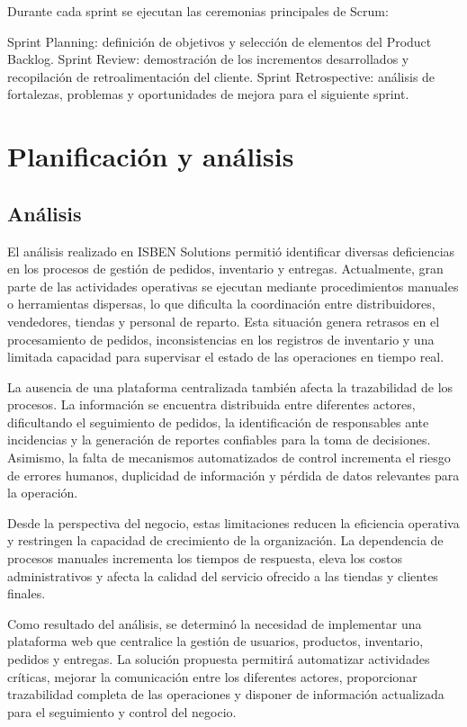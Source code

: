 \documentclass[12pt,a4paper]{report}
\begin{document}
Durante cada sprint se ejecutan las ceremonias principales de Scrum:

Sprint Planning: definición de objetivos y selección de elementos del Product Backlog.
Sprint Review: demostración de los incrementos desarrollados y recopilación de retroalimentación del cliente.
Sprint Retrospective: análisis de fortalezas, problemas y oportunidades de mejora para el siguiente sprint.



\chapter{Planificación y análisis}

\section{Análisis}
El análisis realizado en ISBEN Solutions permitió identificar diversas deficiencias en los procesos de gestión de pedidos, inventario y entregas. Actualmente, gran parte de las actividades operativas se ejecutan mediante procedimientos manuales o herramientas dispersas, lo que dificulta la coordinación entre distribuidores, vendedores, tiendas y personal de reparto. Esta situación genera retrasos en el procesamiento de pedidos, inconsistencias en los registros de inventario y una limitada capacidad para supervisar el estado de las operaciones en tiempo real.

La ausencia de una plataforma centralizada también afecta la trazabilidad de los procesos. La información se encuentra distribuida entre diferentes actores, dificultando el seguimiento de pedidos, la identificación de responsables ante incidencias y la generación de reportes confiables para la toma de decisiones. Asimismo, la falta de mecanismos automatizados de control incrementa el riesgo de errores humanos, duplicidad de información y pérdida de datos relevantes para la operación.

Desde la perspectiva del negocio, estas limitaciones reducen la eficiencia operativa y restringen la capacidad de crecimiento de la organización. La dependencia de procesos manuales incrementa los tiempos de respuesta, eleva los costos administrativos y afecta la calidad del servicio ofrecido a las tiendas y clientes finales.

Como resultado del análisis, se determinó la necesidad de implementar una plataforma web que centralice la gestión de usuarios, productos, inventario, pedidos y entregas. La solución propuesta permitirá automatizar actividades críticas, mejorar la comunicación entre los diferentes actores, proporcionar trazabilidad completa de las operaciones y disponer de información actualizada para el seguimiento y control del negocio.
\end{document}
